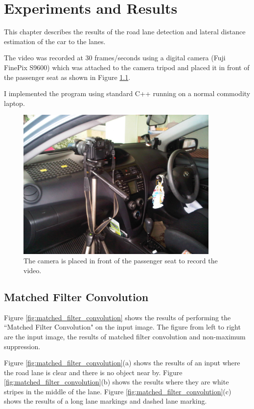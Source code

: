 \setlength{\footskip}{8mm}
\chapter{ Experiments and Results } \label{experiment}
This chapter describes the results of the road lane detection and lateral 
distance estimation of the car to the lanes.

The video was recorded at 30 frames/seconds using a digital camera (Fuji FinePix 
S9600) which was attached to the camera tripod and placed it in front of the passenger seat as shown in Figure 
\ref{fig:camera_in_car}. 

I implemented the program using standard C++ running on a normal commodity 
laptop. 

\begin{figure}
\centering
\includegraphics[width=100mm]{figures/camera_in_car.jpg}
\caption{The camera is placed in front of the passenger seat to record the video. }
\label{fig:camera_in_car}
\end{figure}

\section{Matched Filter Convolution}
Figure \ref{fig:matched_filter_convolution} shows the results of performing the 
``Matched Filter Convolution" on the input image. The figure from left to right 
are the input image, the results of matched filter convolution and non-maximum 
suppression. 

Figure \ref{fig:matched_filter_convolution}(a) shows the results of an input 
where the road lane is clear and there is no object near by. Figure \ref{fig:matched_filter_convolution}(b) shows the results where they are white stripes in the middle of the lane. Figure \ref{fig:matched_filter_convolution}(c) shows the results of a long lane markings and dashed lane marking. 

